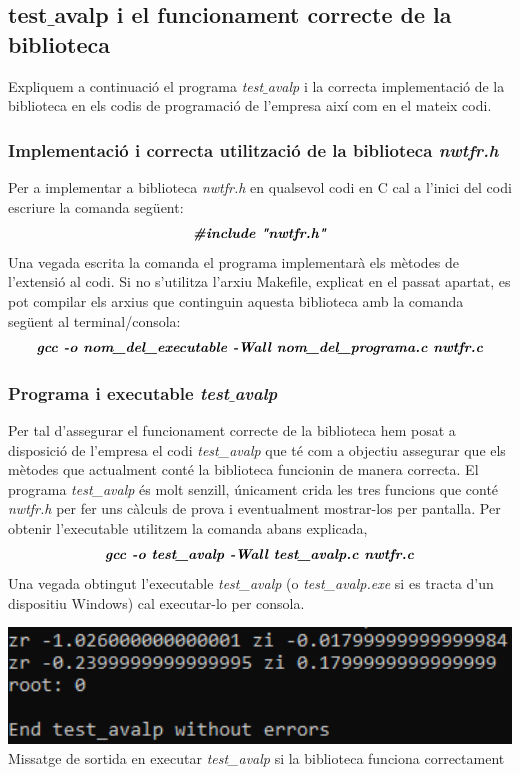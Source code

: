 \documentclass[12pt]{report}
\begin{document}
\subsection{test$\_$avalp i el funcionament correcte de la biblioteca}
Expliquem a continuació el programa \textit{test$\_$avalp} i la correcta implementació de la biblioteca en els codis de programació de l'empresa així com en el mateix codi.
\subsubsection{Implementació i correcta utilització de la biblioteca \textit{nwtfr.h}}
Per a implementar a biblioteca \textit{nwtfr.h} en qualsevol codi en C cal a l'inici del codi escriure la comanda següent:
$$\textbf{\textit{\#include "nwtfr.h"}}$$
Una vegada escrita la comanda el programa implementarà els mètodes de l'extensió al codi.
\newline
Si no s'utilitza l'arxiu Makefile, explicat en el passat apartat, es pot compilar els arxius que continguin aquesta biblioteca amb la comanda següent al terminal/consola:
$$\textbf{\textit{gcc -o nom\_del\_executable -Wall nom\_del\_programa.c nwtfr.c}}$$

\subsubsection{Programa i executable \textit{test$\_$avalp}}
Per tal d'assegurar el funcionament correcte de la biblioteca hem posat a disposició de l'empresa el codi \textit{test\_avalp} que té com a objectiu assegurar que els mètodes que actualment conté la biblioteca funcionin de manera correcta.
\newline
El programa \textit{test\_avalp} és molt senzill, únicament crida les tres funcions que conté \textit{nwtfr.h} per fer uns càlculs de prova i eventualment mostrar-los per pantalla.
\newline
Per obtenir l'executable utilitzem la comanda abans explicada,
$$\textbf{\textit{gcc -o test\_avalp -Wall test\_avalp.c nwtfr.c}}$$
Una vegada obtingut l'executable \textit{test\_avalp} (o \textit{test\_avalp.exe} si es tracta d'un dispositiu Windows) cal executar-lo per consola.
\begin{center}
\includegraphics[width=1\textwidth]{test_avalp.PNG}
\newline
Missatge de sortida en executar \textit{test\_avalp} si la biblioteca funciona correctament
\label{fig:UML_avalp}
\end{center}
\end{document}
